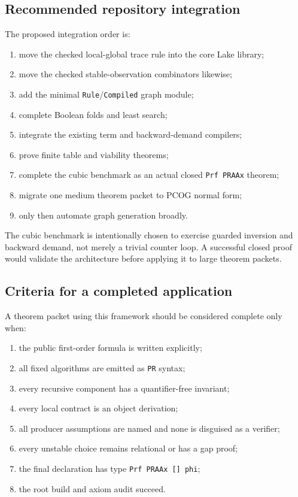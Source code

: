 \subsection{Recommended repository integration}

The proposed integration order is:

\begin{enumerate}
\item move the checked local-global trace rule into the core Lake library;
\item move the checked stable-observation combinators likewise;
\item add the minimal \texttt{Rule}/\texttt{Compiled} graph module;
\item complete Boolean folds and least search;
\item integrate the existing term and backward-demand compilers;
\item prove finite table and viability theorems;
\item complete the cubic benchmark as an actual closed
\texttt{Prf PRAAx} theorem;
\item migrate one medium theorem packet to PCOG normal form;
\item only then automate graph generation broadly.
\end{enumerate}

The cubic benchmark is intentionally chosen to exercise guarded inversion and
backward demand, not merely a trivial counter loop.  A successful closed proof
would validate the architecture before applying it to large theorem packets.

\subsection{Criteria for a completed application}

A theorem packet using this framework should be considered complete only when:

\begin{enumerate}
\item the public first-order formula is written explicitly;
\item all fixed algorithms are emitted as \texttt{PR} syntax;
\item every recursive component has a quantifier-free invariant;
\item every local contract is an object derivation;
\item all producer assumptions are named and none is disguised as a verifier;
\item every unstable choice remains relational or has a gap proof;
\item the final declaration has type \texttt{Prf PRAAx [] phi};
\item the root build and axiom audit succeed.
\end{enumerate}

